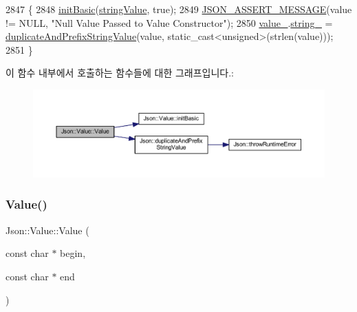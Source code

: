 \begin{DoxyCode}
2847                               \{
2848   \hyperlink{class_json_1_1_value_a32b86b71564157f40f880f5736be822a}{initBasic}(\hyperlink{namespace_json_a7d654b75c16a57007925868e38212b4ea804ef857affea2d415843c73f261c258}{stringValue}, \textcolor{keyword}{true});
2849   \hyperlink{json_8h_ad7facdeeca0f495765e3b204c265eadb}{JSON\_ASSERT\_MESSAGE}(value != NULL, \textcolor{stringliteral}{"Null Value Passed to Value Constructor"});  
2850   \hyperlink{class_json_1_1_value_aef578244546212705b9f81eb84d7e151}{value\_}.\hyperlink{union_json_1_1_value_1_1_value_holder_a70ac2b153bc405527baa3850d2ddc3cb}{string\_} = \hyperlink{namespace_json_a9795a09a0141d1f12d307c4386aeaee6}{duplicateAndPrefixStringValue}(value, 
      static\_cast<unsigned>(strlen(value)));
2851 \}
\end{DoxyCode}
이 함수 내부에서 호출하는 함수들에 대한 그래프입니다.\+:\nopagebreak
\begin{figure}[H]
\begin{center}
\leavevmode
\includegraphics[width=350pt]{class_json_1_1_value_ad87b849356816aca75995dd07302e49d_cgraph}
\end{center}
\end{figure}
\mbox{\label{class_json_1_1_value_a39fa09d1902efbd4350e1236db920571}} 
\subsubsection{\texorpdfstring{Value()}{Value()}\hspace{0.1cm}{\footnotesize\ttfamily [8/12]}}
{\footnotesize\ttfamily Json\+::\+Value\+::\+Value (\begin{DoxyParamCaption}\item[{const char $\ast$}]{begin,  }\item[{const char $\ast$}]{end }\end{DoxyParamCaption})}



